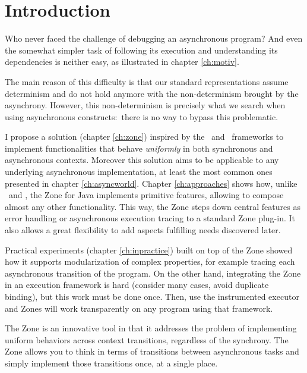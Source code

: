 
\chapter{Introduction}
\label{ch:intro}

Who never faced the challenge of debugging an asynchronous program? And even the somewhat simpler task of following its execution and understanding its dependencies is neither easy, as illustrated in chapter \ref{ch:motiv}.

The main reason of this difficulty is that our standard representations assume determinism and do not hold anymore with the non-determinism brought by the asynchrony.
However, this non-determinism is precisely what we search when using asynchronous constructs:~there is no way to bypass this problematic.

I propose a solution (chapter \ref{ch:zone}) inspired by the \zonejs\ and \zonedrt\ frameworks to implement functionalities that behave \emph{uniformly} in both synchronous and asynchronous contexts. Moreover this solution aims to be applicable to any underlying asynchronous implementation, at least the most common ones presented in chapter \ref{ch:asyncworld}. Chapter \ref{ch:approaches} shows how, unlike \zonejs\ and \zonedrt, the Zone for Java implements primitive features, allowing to compose almost any other functionality. This way, the Zone steps down central features as error handling or asynchronous execution tracing to a standard Zone plug-in. It also allows a great flexibility to add aspects fulfilling needs discovered later.

Practical experiments (chapter \ref{ch:inpractice}) built on top of the Zone showed how it supports modularization of complex properties, for example tracing each asynchronous transition of the program. On the other hand, integrating the Zone in an execution framework is hard (consider many cases, avoid duplicate binding), but this work must be done once. Then, use the instrumented executor and Zones will work transparently on any program using that framework.

The Zone is an innovative tool in that it addresses the problem of implementing uniform behaviors across context transitions, regardless of the synchrony. The Zone allows you to think in terms of transitions between asynchronous tasks and simply implement those transitions once, at a single place.









